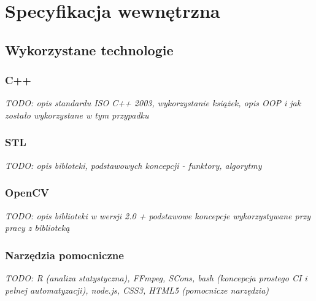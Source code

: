 \subsection{}\label{Subsection_}
\cite{FingertipParticleFilter11}
\cite{ParticleFilter05}

\subsection{}\label{Subsection_}
\cite{TwoStageRandomizedTrees11}
\cite{RandomizedTrees06}

\chapter{Specyfikacja wewnętrzna}\label{Chapter_SpecyfikacjaWewnetrzna}

\section{Wykorzystane technologie}\label{Section_Technologie}

\subsection{C++}\label{Subsection_Cpp}
\textit{TODO: opis standardu ISO C++ 2003, wykorzystanie książek, opis OOP i jak zostało wykorzystane w tym przypadku}
\cite{CppStroustrup}
\cite{EffectiveCpp}
\cite{MoreEffectiveCpp}

\subsection{STL}\label{Subsection_STL}
\textit{TODO: opis bibloteki, podstawowych koncepcji - funktory, algorytmy}
\cite{EffectiveStl}

\subsection{OpenCV}\label{Subsection_OpenCV}
\textit{TODO: opis biblioteki w wersji 2.0 + podstawowe koncepcje wykorzystywane przy pracy z biblioteką}
\cite{LearningOpenCV}
\cite{OpenCVCookbook}

\subsection{Narzędzia pomocniczne}\label{Subsection_PomocniczeTechnologie}
\textit{TODO: R (analiza statystyczna), FFmpeg, SCons, bash (koncepcja prostego CI i pełnej automatyzacji), node.js, CSS3, HTML5 (pomocnicze narzędzia)}

